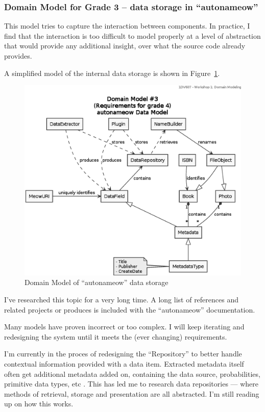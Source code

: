 \subsubsection{Domain Model for Grade 3 -- data storage in ``autonameow''}
This model tries to capture the interaction between components. In practice, I
find that the interaction is too difficult to model properly at a level of
abstraction that would provide any additional insight, over what the source
code already provides.

A simplified model of the internal data storage is shown in
Figure~\ref{fig:uml-domain3b}.


\begin{figure}[htbp]
  \centering
  \includegraphics[width=\linewidth]{uml/domain-model_3b.eps}
  \caption{Domain Model of ``autonameow'' data storage}
  \label{fig:uml-domain3b}
\end{figure}

I've researched this topic for a very long time. A long list of references and
related projects or produces is included with the ``autonameow''
documentation\cite{js:autonameow-docs}.

Many models have proven incorrect or too complex. I will keep iterating and
redesigning the system until it meets the (ever changing) requirements.

I'm currently in the proces of redesigning the ``Repository'' to better handle
contextual information provided with a data item. Extracted metadata itself
often get additional metadata added on, containing the data source,
probabilities, primitive data types, etc \cite{metadata:aalemu-stevens}.
This has led me to research data repositories --- where methods of retrieval,
storage and presentation are all abstracted. I'm still reading up on how this
works.


